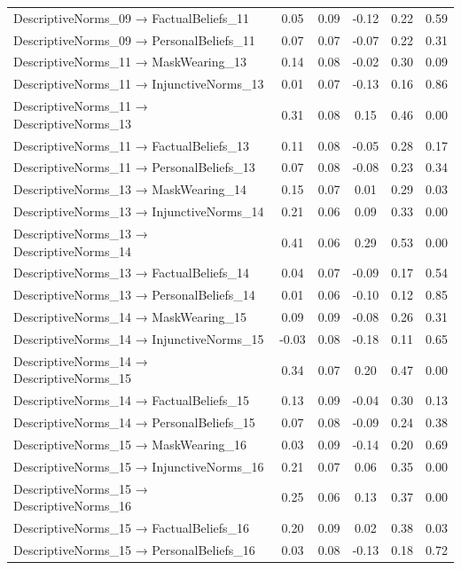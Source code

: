\documentclass[
  man, donotrepeattitle,floatsintext]{apa6}
\begin{document}
\begin{center}
\begin{ThreePartTable}
{\begin{longtable}{lccccc}
DescriptiveNorms\_09 → FactualBeliefs\_11 & 0.05 & 0.09 & -0.12 & 0.22 & 0.59\\
DescriptiveNorms\_09 → PersonalBeliefs\_11 & 0.07 & 0.07 & -0.07 & 0.22 & 0.31\\
DescriptiveNorms\_11 → MaskWearing\_13 & 0.14 & 0.08 & -0.02 & 0.30 & 0.09\\
DescriptiveNorms\_11 → InjunctiveNorms\_13 & 0.01 & 0.07 & -0.13 & 0.16 & 0.86\\
DescriptiveNorms\_11 → DescriptiveNorms\_13 & 0.31 & 0.08 & 0.15 & 0.46 & 0.00\\
DescriptiveNorms\_11 → FactualBeliefs\_13 & 0.11 & 0.08 & -0.05 & 0.28 & 0.17\\
DescriptiveNorms\_11 → PersonalBeliefs\_13 & 0.07 & 0.08 & -0.08 & 0.23 & 0.34\\
DescriptiveNorms\_13 → MaskWearing\_14 & 0.15 & 0.07 & 0.01 & 0.29 & 0.03\\
DescriptiveNorms\_13 → InjunctiveNorms\_14 & 0.21 & 0.06 & 0.09 & 0.33 & 0.00\\
DescriptiveNorms\_13 → DescriptiveNorms\_14 & 0.41 & 0.06 & 0.29 & 0.53 & 0.00\\
DescriptiveNorms\_13 → FactualBeliefs\_14 & 0.04 & 0.07 & -0.09 & 0.17 & 0.54\\
DescriptiveNorms\_13 → PersonalBeliefs\_14 & 0.01 & 0.06 & -0.10 & 0.12 & 0.85\\
DescriptiveNorms\_14 → MaskWearing\_15 & 0.09 & 0.09 & -0.08 & 0.26 & 0.31\\
DescriptiveNorms\_14 → InjunctiveNorms\_15 & -0.03 & 0.08 & -0.18 & 0.11 & 0.65\\
DescriptiveNorms\_14 → DescriptiveNorms\_15 & 0.34 & 0.07 & 0.20 & 0.47 & 0.00\\
DescriptiveNorms\_14 → FactualBeliefs\_15 & 0.13 & 0.09 & -0.04 & 0.30 & 0.13\\
DescriptiveNorms\_14 → PersonalBeliefs\_15 & 0.07 & 0.08 & -0.09 & 0.24 & 0.38\\
DescriptiveNorms\_15 → MaskWearing\_16 & 0.03 & 0.09 & -0.14 & 0.20 & 0.69\\
DescriptiveNorms\_15 → InjunctiveNorms\_16 & 0.21 & 0.07 & 0.06 & 0.35 & 0.00\\
DescriptiveNorms\_15 → DescriptiveNorms\_16 & 0.25 & 0.06 & 0.13 & 0.37 & 0.00\\
DescriptiveNorms\_15 → FactualBeliefs\_16 & 0.20 & 0.09 & 0.02 & 0.38 & 0.03\\
DescriptiveNorms\_15 → PersonalBeliefs\_16 & 0.03 & 0.08 & -0.13 & 0.18 & 0.72\\

\end{longtable}}
\end{ThreePartTable}
\end{center}
\end{document}
